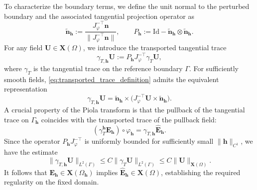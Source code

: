\documentclass[10pt,a4paper]{amsart}
\numberwithin{equation}{section}
\begin{document}
To characterize the boundary terms, we define the unit normal to the perturbed boundary and the associated tangential projection operator as
\[
\widetilde{\mathbf{n}}_{\mathbf{h}} := \frac{J_{\varphi}^{-\top} \mathbf{n}}{\|J_{\varphi}^{-\top} \mathbf{n}\|}, \qquad P_{\mathbf{h}} := \mathrm{Id} - \widetilde{\mathbf{n}}_{\mathbf{h}} \otimes \widetilde{\mathbf{n}}_{\mathbf{h}}.
\]
For any field $\mathbf{U} \in \mathbf{X}(\Omega)$, we introduce the transported tangential trace 
\begin{equation}\label{eq:transported_trace_definition}
\gamma_{T,\mathbf{h}} \mathbf{U} := P_{\mathbf{h}} J_{\varphi}^{-\top} \gamma_T \mathbf{U},
\end{equation}
where $\gamma_T$ is the tangential trace on the reference boundary $\Gamma$. For sufficiently smooth fields, \eqref{eq:transported_trace_definition} admits the equivalent representation
\begin{equation}\label{eq:E_tangential}
\gamma_{T,\mathbf{h}} \mathbf{U} = \widetilde{\mathbf{n}}_{\mathbf{h}} \times \bigl( J_{\varphi}^{-\top} \mathbf{U} \times \widetilde{\mathbf{n}}_{\mathbf{h}} \bigr).
\end{equation}
A crucial property of the Piola transform is that the pullback of the tangential trace on $\Gamma_{\mathbf{h}}$ coincides with the transported trace of the pullback field:
\begin{equation}\label{eq:transported_tangential_trace}
(\gamma_T^{\mathbf{h}} \mathbf{E}_{\mathbf{h}}) \circ \varphi_{\mathbf{h}} = \gamma_{T,\mathbf{h}} \hat{\mathbf{E}}_{\mathbf{h}}.
\end{equation}
Since the operator $P_{\mathbf{h}} J_{\varphi}^{-\top}$ is uniformly bounded for sufficiently small $\|\mathbf{h}\|_{C^1}$, we have the estimate
\[
\|\gamma_{T,\mathbf{h}} \mathbf{U}\|_{L^2(\Gamma)} \le C \|\gamma_T \mathbf{U}\|_{L^2(\Gamma)} \le C \|\mathbf{U}\|_{\mathbf{X}(\Omega)}.
\]
It follows that $\mathbf{E}_{\mathbf{h}} \in \mathbf{X}(\Omega_{\mathbf{h}})$ implies $\hat{\mathbf{E}}_{\mathbf{h}} \in \mathbf{X}(\Omega)$, establishing the required regularity on the fixed domain.
\end{document}
